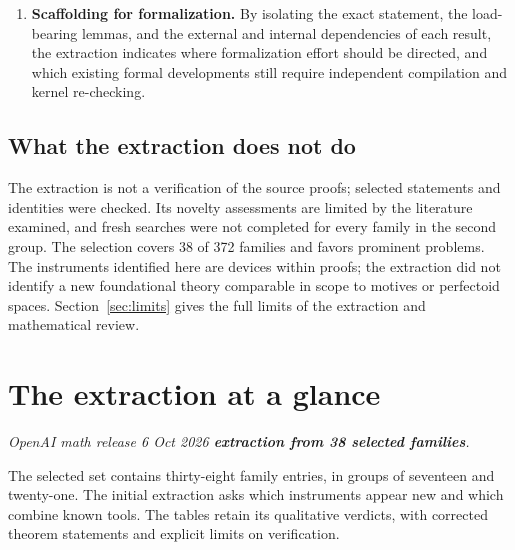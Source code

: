 \documentclass[11pt]{article}
\begin{document}
\begin{enumerate}[label=(\arabic*)]
\item \textbf{Scaffolding for formalization.} By isolating the exact statement, the load-bearing lemmas, and the external and internal dependencies of each result, the extraction indicates where formalization effort should be directed, and which existing formal developments still require independent compilation and kernel re-checking.
\end{enumerate}

\subsection{What the extraction does not do}
The extraction is not a verification of the source proofs; selected statements and identities were checked. Its novelty assessments are limited by the literature examined, and fresh searches were not completed for every family in the second group. The selection covers 38 of 372 families and favors prominent problems. The instruments identified here are devices within proofs; the extraction did not identify a new foundational theory comparable in scope to motives or perfectoid spaces. Section~\ref{sec:limits} gives the full limits of the extraction and mathematical review.

\section{The extraction at a glance}\label{sec:glance}
\noindent\textit{OpenAI math release \textperiodcentered{} 6 Oct 2026 \textperiodcentered{} \textbf{extraction from 38 selected families}.}\par\medskip

The selected set contains thirty-eight family entries, in groups of seventeen and twenty-one. The initial extraction asks which instruments appear new and which combine known tools. The tables retain its qualitative verdicts, with corrected theorem statements and explicit limits on verification.
\end{document}
